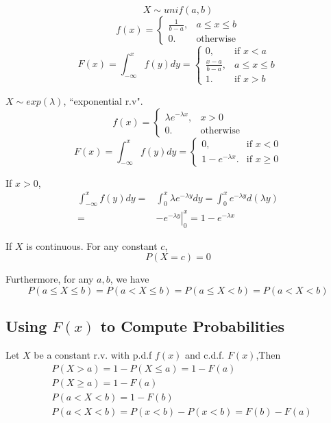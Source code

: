 \begin{exmp}
\[X \sim unif(a,b)\]
\[f(x)=\begin{cases}
\frac{1}{b-a}, 	&a \leq x \leq b\\
0. &\text{otherwise}
\end{cases}\]
\[F(x)=\int_{-\infty}^{x}f(y)dy=\begin{cases}
0,		&\text{if } x < a \\
\frac{x-a}{b-a}, 	&a \leq x \leq b\\
1. 		&\text{if } x > b 
\end{cases}\]
\end{exmp}

\begin{exmp}
$X \sim exp(\lambda)$, ``exponential r.v".
\[f(x)=\begin{cases}
\lambda e^{-\lambda x}, 	& x >0\\
0. &\text{otherwise}
\end{cases}\]
\[F(x)=\int_{-\infty}^{x}f(y)dy=\begin{cases}
0,		&\text{if } x < 0 \\
1-e^{-\lambda x}. 		&\text{if } x \geq 0
\end{cases}\]

If $x>0$,
\begin{align*}
\int_{-\infty}^{x}f(y)dy= & \int_{0}^{x}\lambda e^{-\lambda y}dy=\int_{0}^{x}e^{-\lambda y}d(\lambda y)\\
= & \left.-e^{-\lambda y}\right|_0^x =1-e^{-\lambda x}
\end{align*}
\end{exmp}

\begin{prop}
If $X$ is continuous. For any constant $c$,
\[P(X=c)=0\]

Furthermore, for any $a,b$, we have
\[P(a \leq X \leq b)=P(a <X\leq b)=P(a \leq X< b)=P(a <X< b)\]
\end{prop}

\subsection{Using $F(x)$ to Compute Probabilities}
Let $X$ be a constant r.v. with p.d.f $f(x)$ and c.d.f. $F(x)$,Then
\begin{align*}
&P(X>a)=1-P(X\leq a)=1-F(a)\\
&P(X \geq a)=1-F(a)	\\
&P(a < X <b)=1-F(b)	\\
&P(a<X<b)=P(x<b)-P(x<b)=F(b)-F(a)
\end{align*}

